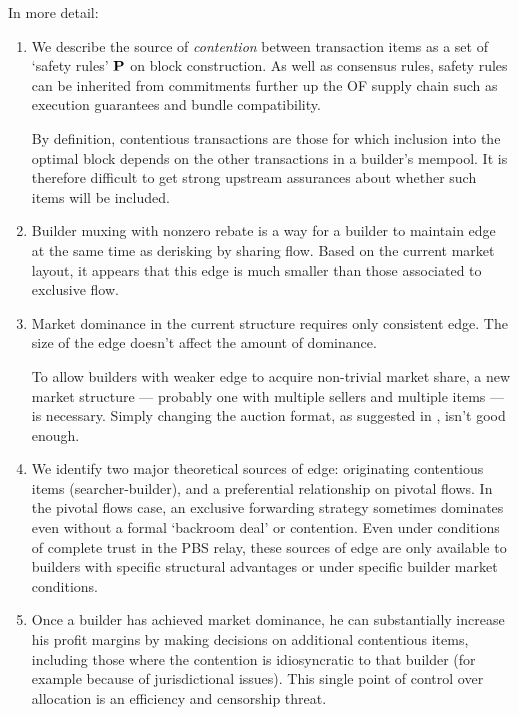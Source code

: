 In more detail:
%
\begin{enumerate}
  \item 
    We describe the source of \emph{contention} between transaction items as a set of `safety rules' $\mathbf{P}$ on block construction.
    As well as consensus rules, safety rules can be inherited from commitments further up the OF supply chain such as execution guarantees and bundle compatibility.
    
    By definition, contentious transactions are those for which inclusion into the optimal block depends on the other transactions in a builder's mempool.
    It is therefore difficult to get strong upstream assurances about whether such items will be included.

  \item
    Builder muxing with nonzero rebate is a way for a builder to maintain edge at the same time as derisking by sharing flow.
    Based on the current market layout, it appears that this edge is much smaller than those associated to exclusive flow.

  \item
    Market dominance in the current structure requires only consistent edge.
    The size of the edge doesn't affect the amount of dominance.
    
    To allow builders with weaker edge to acquire non-trivial market share, a new market structure --- probably one with multiple sellers and multiple items --- is necessary.
    Simply changing the auction format, as suggested in \cite{oz2024whoa}, isn't good enough.

  \item
    We identify two major theoretical sources of edge: originating contentious items (searcher-builder), and a preferential relationship on pivotal flows.
    In the pivotal flows case, an exclusive forwarding strategy sometimes dominates even without a formal `backroom deal' or contention.
    Even under conditions of complete trust in the PBS relay, these sources of edge are only available to builders with specific structural advantages or under specific builder market conditions.

  \item
    Once a builder has achieved market dominance, he can substantially increase his profit margins by making decisions on additional contentious items, including those where the contention is idiosyncratic to that builder (for example because of jurisdictional issues).
    This single point of control over allocation is an efficiency and censorship threat.
\end{enumerate}


